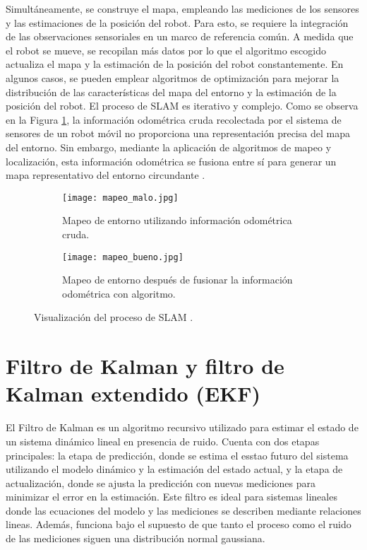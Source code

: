 Simultáneamente, se construye el mapa, empleando las mediciones de los sensores y las estimaciones de la posición del robot. Para esto, se requiere la integración de las observaciones sensoriales en un marco de referencia común. A medida que el robot se mueve, se recopilan más datos por lo que el algoritmo escogido actualiza el mapa y la estimación de la posición del robot constantemente. En algunos casos, se pueden emplear algoritmos de optimización para mejorar la distribución de las características del mapa del entorno y la estimación de la posición del robot. El proceso de SLAM es iterativo y complejo. Como se observa en la Figura \ref{fig:SLAM}, la información odométrica cruda recolectada por el sistema de sensores de un robot móvil no proporciona una representación precisa del mapa del entorno. Sin embargo, mediante la aplicación de algoritmos de mapeo y localización, esta información odométrica se fusiona entre sí para generar un mapa representativo del entorno circundante \cite{thrun_probabilistic_2005}. 

\begin{figure}[H]
	\centering
	\begin{subfigure}{0.5\textwidth}
		\centering	
		\texttt{[image: mapeo\_malo.jpg]}
		\caption{Mapeo de entorno utilizando información odométrica cruda.}
	\end{subfigure}
	
	\begin{subfigure}{0.5\textwidth}
		\centering
		\texttt{[image: mapeo\_bueno.jpg]}
		\caption{Mapeo de entorno después de fusionar la información odométrica con algoritmo.}
	\end{subfigure}
	
	\caption{Visualización del proceso de SLAM \cite{thrun_probabilistic_2005}.}
	\label{fig:SLAM}
\end{figure}
\section{Filtro de Kalman y filtro de Kalman extendido (EKF)}
El Filtro de Kalman es un algoritmo recursivo utilizado para estimar el estado de un sistema dinámico lineal en presencia de ruido. Cuenta con dos etapas principales: la etapa de predicción, donde se estima el esstao futuro del sistema utilizando el modelo dinámico y la estimación del estado actual, y la etapa de actualización, donde se ajusta la predicción con nuevas mediciones para minimizar el error en la estimación. Este filtro es ideal para sistemas lineales donde las ecuaciones del modelo y las mediciones se describen mediante relaciones lineas. Además, funciona bajo el supuesto de que tanto el proceso como el ruido de las mediciones siguen una distribución normal gaussiana. 


